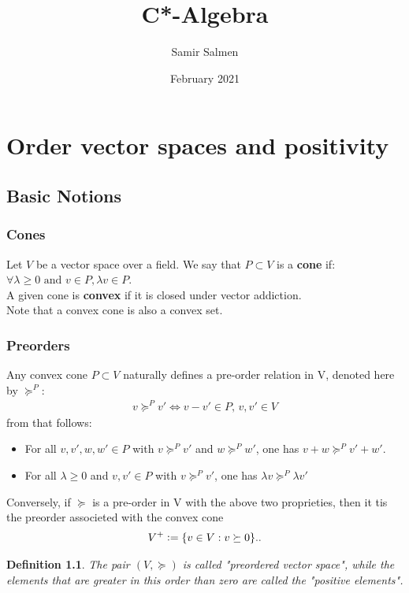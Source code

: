 \documentclass[english, a4paper,12pt]{Iart}
\theoremstyle{plain} %
\newtheorem{definition}{Definition}
\theoremstyle{remark}
\theoremstyle{definition}
\begin{document}
\author{Samir Salmen}
\title{C*-Algebra}
\date{February 2021}
\newcommand{\C}{\mathbb{C}}
\newcommand{\R}{\mathbb{R}}

\newcommand{\cgeqp}{\succeq^P}

\newcommand{\cleqp}{\preceq^P}

\newcommand{\defeq}{\vcentcolon=}
\newcommand{\eqdef}{=\vcentcolon}

\maketitle


\chapter{Order vector spaces and positivity}

\section{Basic Notions}
\subsection{Cones}

Let $V$ be a vector space over a field. We say that $P \subset V$ is a \textbf{cone} if: $\forall \lambda \geq 0 \text{ and } v \in P, \lambda v \in P$.\\
A given cone is \textbf{convex} if it is closed under vector addiction.\\
Note that a convex cone is also a convex set.\\
\subsection{Preorders}
Any convex cone $P \subset V$ naturally defines a pre-order relation in V, denoted here by $\cgeqp$:
\begin{align*}
	v \cgeqp v' \iff v-v' \in P,\, v,v' \in  V 
\end{align*}
from that follows:
\begin{itemize}
	\item For all $v,v',w,w'\in P$ with $v \cgeqp v'$ and $w \cgeqp w'$, one has $v+w \cgeqp v'+w'$.
	\item For all $\lambda \geq 0$ and $v, v' \in  P$ with $v \cgeqp v'$, one has $\lambda v \cgeqp \lambda v'$
\end{itemize}
Conversely, if $\succeq$ is a pre-order in V with the above two proprieties, then it tis the preorder associeted with the convex cone
\begin{align*}
	V^+ \defeq  \{v \in V: v \succeq 0\}.
.\end{align*}

\begin{definition}
	The pair $(V, \succeq)$ is called "preordered vector space", while the elements that are greater in this order than zero are called the "positive elements".
\end{definition}
\end{document}

